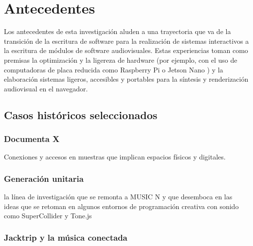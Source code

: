 
\chapter{Antecedentes}



Los antecedentes de esta investigación aluden a una trayectoria que va de la transición de la escritura de software para la realización de sistemas interactivos a la escritura de módulos de software audiovisuales. Estas experiencias toman como premisas la optimización y la ligereza de hardware (por ejemplo, con el uso de computadoras de placa reducida como Raspberry Pi o Jetson Nano ) y la elaboración sistemas ligeros, accesibles y portables para la síntesis y renderización audiovisual en el navegador.

\section{Casos históricos seleccionados}

\subsection{Documenta X}

Conexiones y accesos en muestras que implican espacios físicos y digitales. 

\subsection{Generación unitaria}

la línea de investigación que se remonta a MUSIC N y que desemboca en las ideas que se retoman en algunos entornos de programación creativa con sonido como SuperCollider y Tone.js

\subsection{Jacktrip y la música conectada}

